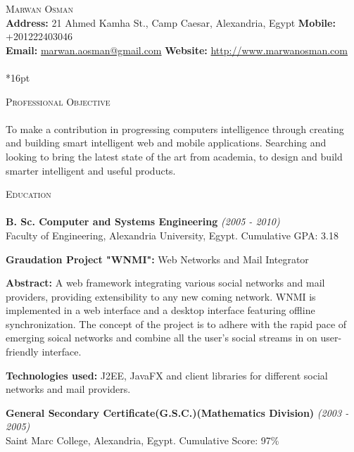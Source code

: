\documentclass[letterpaper,12pt]{article}
\author{Marwan Osman}
\newcommand{\lineunder}{\vspace*{-8pt} \\ \hspace*{-8pt} \hrulefill \\}
\newcommand{\interval}[1] { \textit{(#1)} }
\newcommand{\header}[1]{{\hspace*{0pt}\vspace*{6pt} \textsc{#1}} \vspace*{-6pt} \lineunder}
\newcommand{\education}[3]{{\textbf{#1} \interval{#2}\\{#3}\\ }}
\newcommand{\objective}[1]{{#1\\\vspace*{8pt}}}
\newcommand{\contact}[3]{
\vspace*{-8pt}
{\LARGE \scshape {#1}}\\
#2 \lineunder 
#3
\vspace*{-8pt}
}
\newenvironment{details}{\vspace*{-4pt} \begin{list}{\topsep 0pt \itemsep -2pt}}{\vspace*{4pt}\end{list}}
\begin{document}
\small
\smallskip
\vspace*{-30pt}

\contact{Marwan Osman}
{\textbf{Address:} 21 Ahmed Kamha St., Camp Caesar, Alexandria, Egypt \textbf{Mobile:} +201222403046
\\\textbf{Email:} \href{mailto:marwan.aosman@gmail.com}{marwan.aosman@gmail.com} \textbf{Website:} \url{http://www.marwanosman.com}
}

\vspace*{16pt}

\header{Professional Objective}
\objective{ To make a contribution in progressing computers intelligence through creating and building smart intelligent web and mobile applications.
Searching and looking to bring the latest state of the art from academia, to design and build smarter intelligent and useful products.}

\header{Education}
\education{B. Sc. Computer and Systems Engineering}{2005 - 2010}{Faculty of Engineering, Alexandria University, Egypt. Cumulative GPA: 3.18}
  \begin{details}
    \item \textbf{ Graudation Project "WNMI":} Web Networks and Mail Integrator
    \item \textbf{ Abstract:} A web framework integrating various social networks and mail providers, providing extensibility to any new coming network. WNMI is implemented in a web interface and a desktop interface featuring offline synchronization. The concept of the project is to adhere with the rapid pace of emerging soical networks and combine all the user's social streams in on user-friendly interface.
    \item \textbf{ Technologies used:} J2EE, JavaFX and client libraries for different social networks and mail providers.
  \end{details}
\vspace*{4pt}
\education{General Secondary Certificate(G.S.C.)(Mathematics Division)}{2003 - 2005}{Saint Marc College, Alexandria, Egypt. Cumulative Score: 97\%}
\vspace*{4pt}
\end{document}

